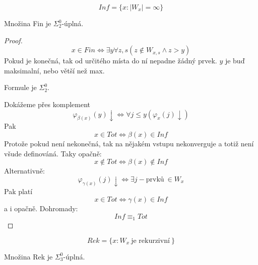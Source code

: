 \begin{definition}[Inf]
	\[ Inf = \{ x: |W_x| = \infty \} \]
\end{definition}

\begin{theorem}
	Množina Fin je $\Sigma_2^0$-úplná.
\end{theorem}
\begin{proof}
	\[ x \in Fin \iff \exists y \forall z, s (z \notin W_{x, s} \land z > y) \]
	Pokud je konečná, tak od určitého místa do ní nepadne žádný prvek.
	$y$ je buď maksimalní, nebo větší než max.

	Formule je $\Sigma_2^0$.

	Dokážeme přes komplement
	\[ \varphi_{\beta(x)}(y) \downarrow \iff \forall j \leq y (\varphi_x(j) \downarrow) \]
	Pak
	\[ x \in Tot \iff \beta(x) \in Inf \]
	Protože pokud není nekonečná, tak na nějakém vstupu nekonverguje a totiž není všude definováná.
	Taky opačně:
	\[ x \notin Tot \iff \beta(x) \notin Inf \]
	Alternativně:
	\[ \varphi_{\gamma(x)} (j) \downarrow \iff \exists j-\text{prvků}\ \in W_x \]
	Pak platí
	\[ x \in Tot \iff \gamma(x) \in Inf \]
	a i opačně.
	Dohromady:
	\[ Inf \equiv_1 Tot \]
\end{proof}

\begin{definition}[Rek]
	\[ Rek = \{ x: W_x\ \text{je rekurzivní}\ \} \]
\end{definition}

\begin{theorem}
	Množina Rek je $\Sigma_3^0$-úplná.
\end{theorem}
